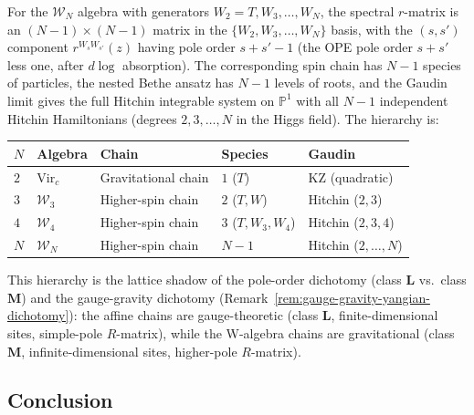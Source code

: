 \begin{remark}%
\label{rem:general-wn-chains}%
%
For the $\mathcal{W}_N$ algebra with generators
$W_2 = T, W_3, \ldots, W_N$, the spectral $r$-matrix is an
$(N-1) \times (N-1)$ matrix in the $\{W_2, W_3, \ldots, W_N\}$
basis, with the $(s, s')$ component $r^{W_s W_{s'}}(z)$ having
pole order $s + s' - 1$ (the OPE pole order $s + s'$ less one,
after $d\log$ absorption).
The corresponding spin chain has $N - 1$ species of particles,
the nested Bethe ansatz has $N - 1$ levels of roots, and the
Gaudin limit gives the full Hitchin integrable system on
$\mathbb{P}^1$ with all $N - 1$ independent Hitchin
Hamiltonians (degrees $2, 3, \ldots, N$ in the Higgs field).
The hierarchy is:
\begin{center}
\small
\renewcommand{\arraystretch}{1.3}
\begin{tabular}{lllll}
\toprule
$N$ & Algebra & Chain & Species & Gaudin \\
\midrule
$2$ & $\mathrm{Vir}_c$ & Gravitational chain
 & $1$ ($T$) & KZ (quadratic) \\
$3$ & $\mathcal{W}_3$ & Higher-spin chain
 & $2$ ($T, W$) & Hitchin ($2, 3$) \\
$4$ & $\mathcal{W}_4$ & Higher-spin chain
 & $3$ ($T, W_3, W_4$) & Hitchin ($2, 3, 4$) \\
$N$ & $\mathcal{W}_N$ & Higher-spin chain
 & $N-1$ & Hitchin ($2, \ldots, N$) \\
\bottomrule
\end{tabular}
\end{center}
\noindent
This hierarchy is the lattice shadow of the pole-order
dichotomy (class $\mathbf{L}$ vs.\ class $\mathbf{M}$)
and the gauge-gravity dichotomy
(Remark~\ref{rem:gauge-gravity-yangian-dichotomy}):
the affine chains are gauge-theoretic (class $\mathbf{L}$,
finite-dimensional sites, simple-pole $R$-matrix), while
the W-algebra chains are gravitational
(class $\mathbf{M}$, infinite-dimensional sites,
higher-pole $R$-matrix).
\end{remark}


\subsection{Conclusion}

